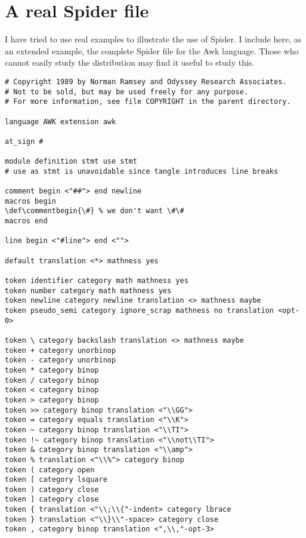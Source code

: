 \section{A real {Spider} file}
I have tried to use real examples to illustrate the use of {Spider}.
I include here, as an extended example, the complete {Spider} file for
the Awk language. 
Those who cannot easily study the distribution may find it useful to
study this.
\begingroup\small
\begin{verbatim}
# Copyright 1989 by Norman Ramsey and Odyssey Research Associates.
# Not to be sold, but may be used freely for any purpose.
# For more information, see file COPYRIGHT in the parent directory.

language AWK extension awk

at_sign #

module definition stmt use stmt
# use as stmt is unavoidable since tangle introduces line breaks

comment begin <"##"> end newline
macros begin
\def\commentbegin{\#} % we don't want \#\#
macros end

line begin <"#line"> end <"">

default translation <*> mathness yes

token identifier category math mathness yes
token number category math mathness yes
token newline category newline translation <> mathness maybe
token pseudo_semi category ignore_scrap mathness no translation <opt-0>

token \ category backslash translation <> mathness maybe
token + category unorbinop
token - category unorbinop
token * category binop
token / category binop
token < category binop
token > category binop
token >> category binop translation <"\\GG">
token = category equals translation <"\\K">
token ~ category binop translation <"\\TI">
token !~ category binop translation <"\\not\\TI">
token & category binop translation <"\\amp">
token % translation <"\\%"> category binop
token ( category open
token [ category lsquare
token ) category close
token ] category close
token { translation <"\\;\\{"-indent> category lbrace
token } translation <"\\}\\"-space> category close
token , category binop translation <",\\,"-opt-3>


\end{verbatim}
